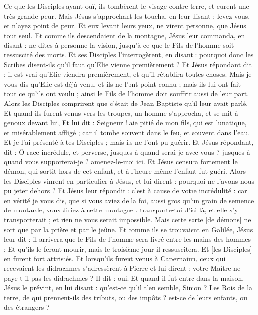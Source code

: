 \begin{multicols}{2}
Ce que les Disciples ayant ouï, ils tombèrent le visage contre terre, et eurent une très grande peur.
Mais Jésus s'approchant les toucha, en leur disant : levez-vous, et n'ayez point de peur.
Et eux levant leurs yeux, ne virent personne, que Jésus tout seul.
Et comme ils descendaient de la montagne, Jésus leur commanda, en disant : ne dites à personne la vision, jusqu'à ce que le Fils de l'homme soit ressuscité des morts.
Et ses Disciples l'interrogèrent, en disant : pourquoi donc les Scribes disent-ils qu'il faut qu'Elie vienne premièrement ?
Et Jésus répondant dit : il est vrai qu'Elie viendra premièrement, et qu'il rétablira toutes choses.
Mais je vous dis qu'Elie est déjà venu, et ils ne l'ont point connu ; mais ils lui ont fait tout ce qu'ils ont voulu ; ainsi le Fils de l'homme doit souffrir aussi de leur part.
Alors les Disciples comprirent que c'était de Jean Baptiste qu'il leur avait parlé.
Et quand ils furent venus vers les troupes, un homme s'approcha, et se mit à genoux devant lui,
Et lui dit : Seigneur ! aie pitié de mon fils, qui est lunatique, et misérablement affligé ; car il tombe souvent dans le feu, et souvent dans l'eau.
Et je l'ai présenté à tes Disciples ; mais ils ne l'ont pu guérir.
Et Jésus répondant, dit : Ô race incrédule, et perverse, jusques à quand serai-je avec vous ? jusques à quand vous supporterai-je ? amenez-le-moi ici.
Et Jésus censura fortement le démon, qui sortit hors de cet enfant, et à l'heure même l'enfant fut guéri.
Alors les Disciples vinrent en particulier à Jésus, et lui dirent : pourquoi ne l'avons-nous pu jeter dehors ?
Et Jésus leur répondit : c'est à cause de votre incrédulité : car en vérité je vous dis, que si vous aviez de la foi, aussi gros qu'un grain de semence de moutarde, vous diriez à cette montagne : transporte-toi d'ici là, et elle s'y transporterait ; et rien ne vous serait impossible.
Mais cette sorte [de démons] ne sort que par la prière et par le jeûne.
Et comme ils se trouvaient en Galilée, Jésus leur dit : il arrivera que le Fils de l'homme sera livré entre les mains des hommes ;
Et qu'ils le feront mourir, mais le troisième jour il ressuscitera. Et [les Disciples] en furent fort attristés.
Et lorsqu'ils furent venus à Capernaüm, ceux qui recevaient les didrachmes s'adressèrent à Pierre et lui dirent : votre Maître ne paye-t-il pas les didrachmes ?
Il dit : oui. Et quand il fut entré dans la maison, Jésus le prévint, en lui disant : qu'est-ce qu'il t'en semble, Simon ? Les Rois de la terre, de qui prennent-ils des tributs, ou des impôts ? est-ce de leurs enfants, ou des étrangers ?

\end{multicols}
